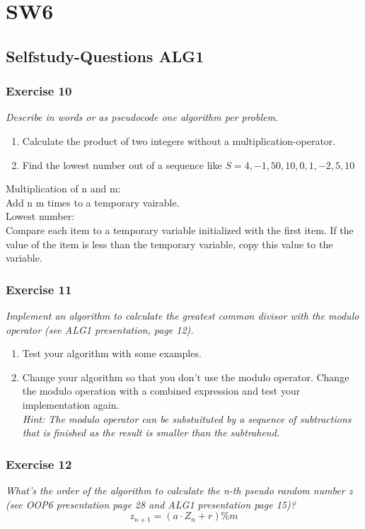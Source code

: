 \section{SW6}
\subsection{Selfstudy-Questions ALG1}

\subsubsection*{Exercise 10}
\textit{Describe in words or as pseudocode one algorithm per problem.}
\begin{enumerate}[label={(\alph*)}]
	\item Calculate the product of two integers without a multiplication-operator.
	\item Find the lowest number out of a sequence like $S = {4,-1,50,10,0,1,-2,5,10}$
\end{enumerate}
Multiplication of n and m: \\
Add n m times to a temporary vairable. \\
Lowest number: \\
Compare each item to a temporary variable initialized with the first item. If 
the value of the item is less than the temporary variable, copy this value to 
the variable. 

\subsubsection*{Exercise 11}
\textit{Implement an algorithm to calculate the greatest common divisor
with the modulo operator (see ALG1 presentation, page 12).}
\begin{enumerate}[label={(\alph*)}]
	\item Test your algorithm with some examples.
	\item Change your algorithm so that you don't use the modulo operator. 
		Change the modulo operation with a combined expression and test 
		your implementation again. \\
		\textit{Hint: The modulo operator can be substuituted by a 
			sequence of subtractions that is finished as the 
			result is smaller than the subtrahend.}
\end{enumerate}

\subsubsection*{Exercise 12}
\textit{What's the order of the algorithm to calculate the n-th pseudo random 
number z (see OOP6 presentation page 28 and ALG1 presentation page 15)?}
\[ z_{n+1} = (a \cdot Z_n + r) \% m \]
